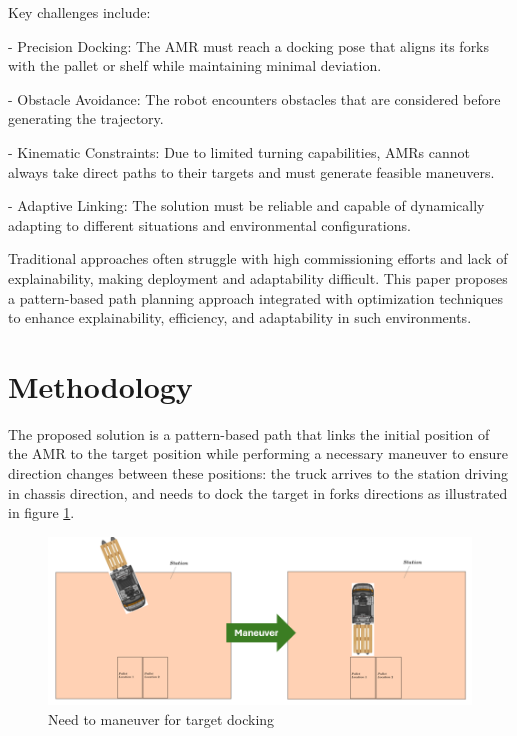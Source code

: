 \documentclass{amam}                %
\begin{document}
Key challenges include:

- Precision Docking: The AMR must reach a docking pose that aligns its forks with the pallet or shelf while maintaining minimal deviation.

- Obstacle Avoidance: The robot encounters obstacles that are considered before generating the trajectory.

- Kinematic Constraints: Due to limited turning capabilities, AMRs cannot always take direct paths to their targets and must generate feasible maneuvers.

- Adaptive Linking: The solution must be reliable and capable of dynamically adapting to different situations and environmental configurations.

Traditional approaches often struggle with high commissioning efforts and lack of explainability, making deployment and adaptability difficult. This paper proposes a pattern-based path planning approach integrated with optimization techniques to enhance explainability, efficiency, and adaptability in such environments.

\section{Methodology}
The proposed solution is a pattern-based path that links the initial position of the AMR to the target position while performing a necessary maneuver to ensure direction changes between these positions: the truck arrives to the station driving in chassis direction, and needs to dock the target in forks directions as illustrated in figure \ref{maneuver}.
\begin{figure}[t]
  \centering \includegraphics[width=1.0\linewidth]{maneuver.png}
  \caption{Need to maneuver for target docking}
  \label{maneuver}
\end{figure}
\end{document}
